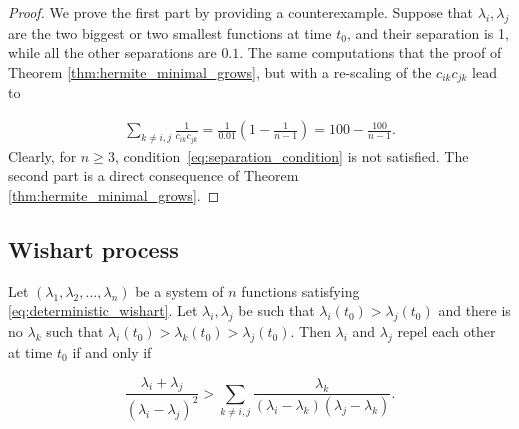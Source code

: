 \begin{proof}
    We prove the first part by providing a counterexample. Suppose that $\lambda_i,\lambda_j$ are the two biggest or two smallest functions at time $t_0$, and their separation is 1, while all the other separations are $0.1$. The same computations that the proof of Theorem \ref{thm:hermite_minimal_grows}, but with a re-scaling of the $c_{ik}c_{jk}$ lead to

    \begin{align*}
        \sum_{k\neq i,j} \frac{1}{c_{ik}c_{jk}} = \frac{1}{0.01}\left( 1 - \frac1{n-1}\right) = 100 - \frac{100}{n-1}.
    \end{align*} Clearly, for $n\ge 3$, condition~\eqref{eq:separation_condition} is not satisfied. The second part is a direct consequence of Theorem \ref{thm:hermite_minimal_grows}.
\end{proof}

\subsection{Wishart process}

\begin{lemma} \label{lemma:separating_condition_wishart}
    Let $(\lambda_1, \lambda_2, \dots, \lambda_n)$ be a system of $n$ functions satisfying \eqref{eq:deterministic_wishart}. Let $\lambda_i, \lambda_j$ be such that $\lambda_i(t_0) > \lambda_j(t_0)$ and there is no $\lambda_k$ such that $\lambda_i(t_0) > \lambda_k(t_0) > \lambda_j(t_0)$. Then $\lambda_i$ and $\lambda_j$ repel each other at time $t_0$ if and only if 

    \begin{equation} \label{eq:separation_condition_wishart}
        \frac{\lambda_i + \lambda_j}{(\lambda_i - \lambda_j)^2} > \sum_{k\neq i,j} \frac{\lambda_k}{(\lambda_i-\lambda_k)(\lambda_j-\lambda_k)}.
    \end{equation}
\end{lemma}

